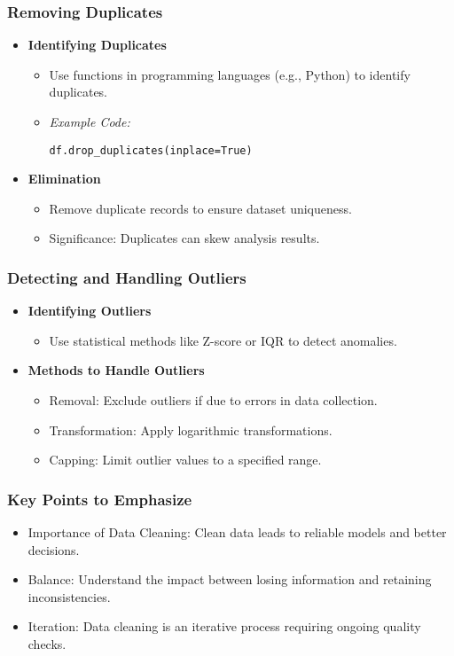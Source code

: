 \documentclass[aspectratio=169]{beamer}
\begin{document}
\begin{frame}[fragile]
    \frametitle{Removing Duplicates}
    \begin{itemize}
        \item \textbf{Identifying Duplicates}
        \begin{itemize}
            \item Use functions in programming languages (e.g., Python) to identify duplicates.
            \item \textit{Example Code:}
            \begin{lstlisting}
df.drop_duplicates(inplace=True)
            \end{lstlisting}
        \end{itemize}
        \item \textbf{Elimination}
        \begin{itemize}
            \item Remove duplicate records to ensure dataset uniqueness.
            \item Significance: Duplicates can skew analysis results.
        \end{itemize}
    \end{itemize}
\end{frame}

\begin{frame}[fragile]
    \frametitle{Detecting and Handling Outliers}
    \begin{itemize}
        \item \textbf{Identifying Outliers}
        \begin{itemize}
            \item Use statistical methods like Z-score or IQR to detect anomalies.
        \end{itemize}
        \item \textbf{Methods to Handle Outliers}
        \begin{itemize}
            \item Removal: Exclude outliers if due to errors in data collection.
            \item Transformation: Apply logarithmic transformations.
            \item Capping: Limit outlier values to a specified range.
        \end{itemize}
    \end{itemize}
\end{frame}

\begin{frame}
    \frametitle{Key Points to Emphasize}
    \begin{itemize}
        \item Importance of Data Cleaning: Clean data leads to reliable models and better decisions.
        \item Balance: Understand the impact between losing information and retaining inconsistencies.
        \item Iteration: Data cleaning is an iterative process requiring ongoing quality checks.
    \end{itemize}
\end{frame}
\end{document}
